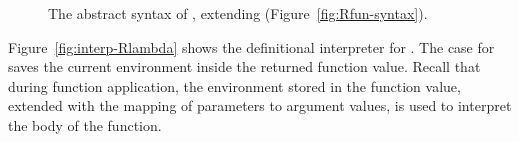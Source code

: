\documentclass[7x10,nocrop]{TimesAPriori_MIT}%
\newcommand{\gray}[1]{{\color{gray} #1}}
\def\racketEd{0}
\def\pythonEd{1}
\def\edition{0}
\begin{document}
\begin{figure}[tp]
\centering
\fbox{
  \begin{minipage}{0.96\textwidth}
    \small
{\if\edition\racketEd
\[
\begin{array}{l}
  \gray{\LintOpAST} \\ \hline
  \gray{\LvarASTRacket{}} \\ \hline
  \gray{\LifASTRacket{}} \\ \hline
  \gray{\LwhileASTRacket{}} \\ \hline
  \gray{\LtupASTRacket{}} \\ \hline
  \gray{\LfunASTRacket} \\ \hline
  \LlambdaASTRacket \\
  \begin{array}{lcl}
  \LangLamM{} &::=& \PROGRAMDEFSEXP{\code{'()}}{\LP\Def\ldots\RP}{\Exp}
  \end{array}
\end{array}
\]
\fi}
{\if\edition\pythonEd
\[
\begin{array}{l}
  \gray{\LintASTPython} \\ \hline
  \gray{\LvarASTPython{}} \\ \hline
  \gray{\LifASTPython{}} \\ \hline
  \gray{\LwhileASTPython{}} \\ \hline
  \gray{\LtupASTPython{}} \\ \hline
  \gray{\LfunASTPython} \\ \hline
  \LlambdaASTPython \\
  \begin{array}{lcl}
  \LangLamM{} &::=& \PROGRAM{}{\LS \Def \ldots \Stmt \ldots \RS}
  \end{array}
\end{array}
\]
\fi}
\end{minipage}
}
\caption{The abstract syntax of \LangLam{}, extending \LangFun{} (Figure~\ref{fig:Rfun-syntax}).}
\label{fig:Rlam-syntax}
\end{figure}

\label{sec:interp-Rlambda}

Figure~\ref{fig:interp-Rlambda} shows the definitional interpreter for
\LangLam{}. The case for  saves the current environment
inside the returned function value. Recall that during function
application, the environment stored in the function value, extended
with the mapping of parameters to argument values, is used to
interpret the body of the function.
\end{document}
